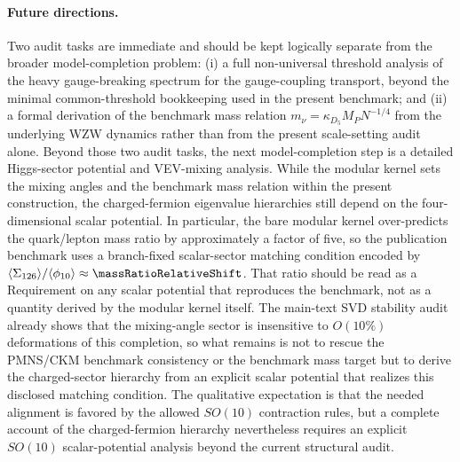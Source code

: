 \documentclass[11pt]{article}
\begin{document}
\paragraph{Future directions.} Two audit tasks are immediate and should be kept logically separate from the broader model-completion problem: (i) a full non-universal threshold analysis of the heavy gauge-breaking spectrum for the gauge-coupling transport, beyond the minimal common-threshold bookkeeping used in the present benchmark; and (ii) a formal derivation of the benchmark mass relation $m_\nu=\kappa_{D_5}M_PN^{-1/4}$ from the underlying WZW dynamics rather than from the present scale-setting audit alone. Beyond those two audit tasks, the next model-completion step is a detailed Higgs-sector potential and VEV-mixing analysis. While the modular kernel sets the mixing angles and the benchmark mass relation within the present construction, the charged-fermion eigenvalue hierarchies still depend on the four-dimensional scalar potential. In particular, the bare modular kernel over-predicts the quark/lepton mass ratio by approximately a factor of five, so the publication benchmark uses a branch-fixed scalar-sector matching condition encoded by $\langle \Sigma_{126} \rangle / \langle \phi_{10} \rangle\approx\massRatioRelativeShift$. That ratio should be read as a Requirement on any scalar potential that reproduces the benchmark, not as a quantity derived by the modular kernel itself. The main-text SVD stability audit already shows that the mixing-angle sector is insensitive to $O(10\%)$ deformations of this completion, so what remains is not to rescue the PMNS/CKM benchmark consistency or the benchmark mass target but to derive the charged-sector hierarchy from an explicit scalar potential that realizes this disclosed matching condition. The qualitative expectation is that the needed alignment is favored by the allowed $SO(10)$ contraction rules, but a complete account of the charged-fermion hierarchy nevertheless requires an explicit $SO(10)$ scalar-potential analysis beyond the current structural audit.
\end{document}

